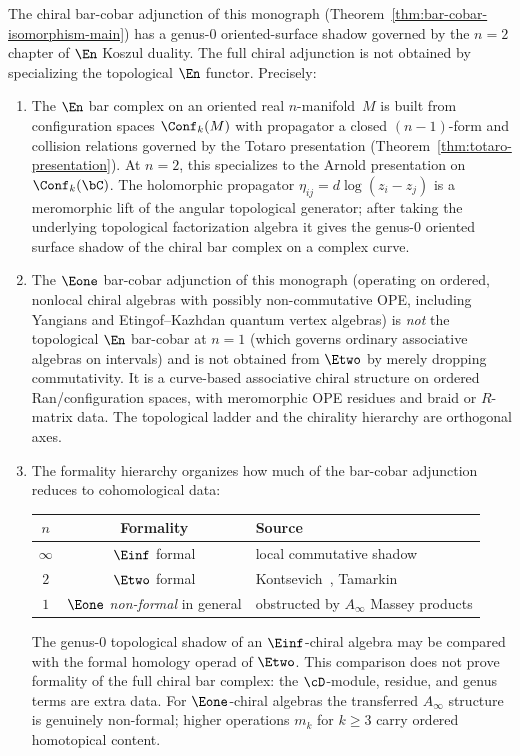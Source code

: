 \begin{theorem}
\label{thm:en-chiral-bridge}
The chiral bar-cobar adjunction of this monograph
\textup{(}Theorem~\ref{thm:bar-cobar-isomorphism-main}\textup{)}
has a genus-$0$ oriented-surface shadow governed by the $n = 2$
chapter of $\En$ Koszul duality. The full chiral adjunction is not
obtained by specializing the topological $\En$ functor. Precisely:
\begin{enumerate}[label=\textup{(\roman*)}]
\item The $\En$ bar complex on an oriented real $n$-manifold~$M$ is
 built from configuration spaces $\Conf_k(M)$ with propagator a
 closed $(n{-}1)$-form and collision relations governed by the Totaro
 presentation
 \textup{(}Theorem~\ref{thm:totaro-presentation}\textup{)}.
 At $n = 2$, this specializes to the Arnold presentation on
 $\Conf_k(\bC)$. The holomorphic propagator
 $\eta_{ij} = d\log(z_i - z_j)$ is a meromorphic lift of the
 angular topological generator; after taking the underlying
 topological factorization algebra it gives the genus-$0$ oriented
 surface shadow of the chiral bar complex on a complex curve.
\item The $\Eone$ bar-cobar adjunction of this monograph
 \textup{(}operating on ordered, nonlocal chiral algebras with
 possibly non-commutative OPE, including Yangians and
 Etingof--Kazhdan quantum vertex algebras\textup{)} is
 \emph{not} the topological $\En$ bar-cobar at $n = 1$
 \textup{(}which governs ordinary associative algebras on
 intervals\textup{)} and is not obtained from $\Etwo$ by merely
 dropping commutativity. It is a curve-based associative chiral
 structure on ordered Ran/configuration spaces, with meromorphic OPE
 residues and braid or $R$-matrix data. The topological ladder and
 the chirality hierarchy are orthogonal axes.
\item The formality hierarchy organizes how much of the bar-cobar
 adjunction reduces to cohomological data:
 \begin{center}
 \renewcommand{\arraystretch}{1.15}
 \begin{tabular}{ccl}
 $n$ & Formality & Source \\
 \hline
 $\infty$ & $\Einf$ formal & local commutative shadow \\
 $2$ & $\Etwo$ formal & Kontsevich~\cite{Kon99}, Tamarkin \\
 $1$ & $\Eone$ \emph{non-formal} in general
 & obstructed by $A_\infty$ Massey products
 \end{tabular}
 \end{center}
 The genus-$0$ topological shadow of an $\Einf$-chiral algebra may be
 compared with the formal homology operad of $\Etwo$. This comparison
 does not prove formality of the full chiral bar complex: the
 $\cD$-module, residue, and genus terms are extra data. For
 $\Eone$-chiral algebras the transferred $A_\infty$ structure is
 genuinely non-formal; higher operations $m_k$ for $k \ge 3$ carry
 ordered homotopical content.
\end{enumerate}
\end{theorem}

